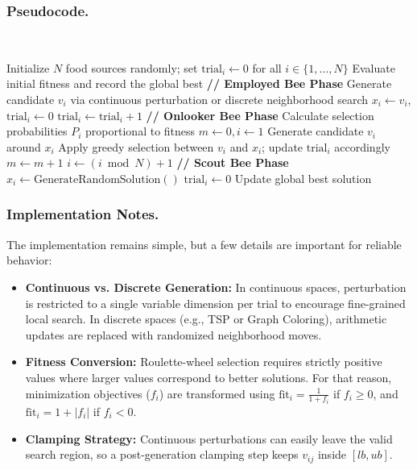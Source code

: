 \subsubsection{Pseudocode.}~

\begin{algorithm}[H]
\caption{Artificial Bee Colony (ABC)}
\label{alg:abc}
\begin{algorithmic}[1]
  \State Initialize $N$ food sources randomly; set $\text{trial}_i \gets 0$ for all $i \in \{1, \dots, N\}$
  \State Evaluate initial fitness and record the global best
    \State \textbf{// Employed Bee Phase}
      \State Generate candidate $v_i$ via continuous perturbation or discrete neighborhood search
        \State $x_i \gets v_i$, $\text{trial}_i \gets 0$
      \Else
        \State $\text{trial}_i \gets \text{trial}_i + 1$
      \EndIf
    \EndFor
    \State \textbf{// Onlooker Bee Phase}
    \State Calculate selection probabilities $P_i$ proportional to fitness
    \State $m \gets 0, i \gets 1$
        \State Generate candidate $v_i$ around $x_i$
        \State Apply greedy selection between $v_i$ and $x_i$; update $\text{trial}_i$ accordingly
        \State $m \gets m + 1$
      \EndIf
      \State $i \gets (i \bmod N) + 1$
    \EndWhile
    \State \textbf{// Scout Bee Phase}
        \State $x_i \gets \text{GenerateRandomSolution}()$
        \State $\text{trial}_i \gets 0$
      \EndIf
    \EndFor
    \State Update global best solution
  \EndFor
\end{algorithmic}
\end{algorithm}

\subsubsection{Implementation Notes.}
The implementation remains simple, but a few details are important for reliable behavior:
\begin{itemize}
  \item \textbf{Continuous vs. Discrete Generation:} In continuous spaces, perturbation is restricted to a single variable dimension per trial to encourage fine-grained local search. In discrete spaces (e.g., TSP or Graph Coloring), arithmetic updates are replaced with randomized neighborhood moves.
  \item \textbf{Fitness Conversion:} Roulette-wheel selection requires strictly positive values where larger values correspond to better solutions. For that reason, minimization objectives ($f_i$) are transformed using $\text{fit}_i = \frac{1}{1 + f_i}$ if $f_i \geq 0$, and $\text{fit}_i = 1 + |f_i|$ if $f_i < 0$.
  \item \textbf{Clamping Strategy:} Continuous perturbations can easily leave the valid search region, so a post-generation clamping step keeps $v_{ij}$ inside $[lb, ub]$.
\end{itemize}

